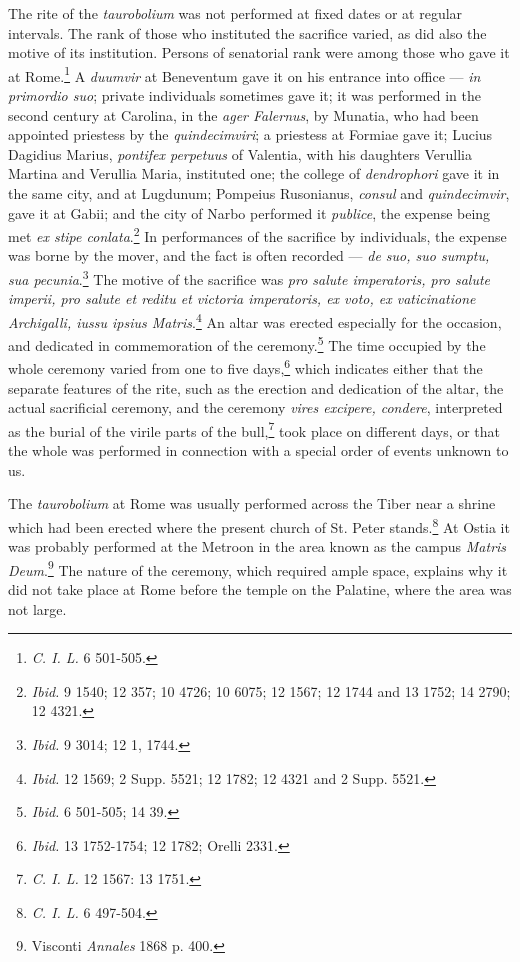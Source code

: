 \documentclass[a4paper, 11pt, oneside, polutonikogreek, english]{article}
\begin{document}
The rite of the \emph{taurobolium} was not performed at fixed dates or at regular intervals. The rank of those who instituted the sacrifice varied, as did also the motive of its institution. Persons of senatorial rank were among those who gave it at Rome.\footnote{\emph{C. I. L.} 6 501-505.} A \emph{duumvir} at Beneventum gave it on his entrance into office --- \emph{in primordio suo}; private individuals sometimes gave it; it was performed in the second century at Carolina, in the \emph{ager Falernus}, by Munatia, who had been appointed priestess by the \emph{quindecimviri}; a priestess at Formiae gave it; Lucius Dagidius Marius, \emph{pontifex perpetuus} of Valentia, with his daughters Verullia Martina and Verullia Maria, instituted one; the college of \emph{dendrophori} gave it in the same city, and at Lugdunum; Pompeius Rusonianus, \emph{consul} and \emph{quindecimvir}, gave it at Gabii; and the city of Narbo performed it \emph{publice}, the expense being met \emph{ex stipe conlata}.\footnote{\emph{Ibid.} 9 1540; 12 357; 10 4726; 10 6075; 12 1567; 12 1744 and 13 1752; 14 2790; 12 4321.} In performances of the sacrifice by individuals, the expense was borne by the mover, and the fact is often recorded --- \emph{de suo, suo sumptu, sua pecunia}.\footnote{\emph{Ibid.} 9 3014; 12 1, 1744.} The motive of the sacrifice was \emph{pro salute imperatoris, pro salute imperii, pro salute et reditu et victoria imperatoris, ex voto, ex vaticinatione Archigalli, iussu ipsius Matris}.\footnote{\emph{Ibid.} 12 1569; 2 Supp. 5521; 12 1782; 12 4321 and 2 Supp. 5521.} An altar was erected especially for the occasion, and dedicated in commemoration of the ceremony.\footnote{\emph{Ibid.} 6 501-505; 14 39.} The time occupied by the whole ceremony varied from one to five days,\footnote{\emph{Ibid.} 13 1752-1754; 12 1782; Orelli 2331.} which indicates either that the separate features of the rite, such as the erection and dedication of the altar, the actual sacrificial ceremony, and the ceremony \emph{vires excipere, condere}, interpreted as the burial of the virile parts of the bull,\footnote{\emph{C. I. L.} 12 1567: 13 1751.} took place on different days, or that the whole was performed in connection with a special order of events unknown to us.

The \emph{taurobolium} at Rome was usually performed across the Tiber near a shrine which had been erected where the present church of St. Peter stands.\footnote{\emph{C. I. L.} 6 497-504.} At Ostia it was probably performed at the Metroon in the area known as the campus \emph{Matris Deum}.\footnote{Visconti \emph{Annales} 1868 p. 400.} The nature of the ceremony, which required ample space, explains why it did not take place at Rome before the temple on the Palatine, where the area was not large.
\end{document}
